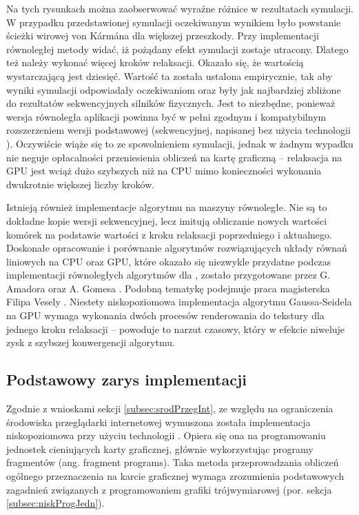 Na tych rysunkach można zaobserwować wyraźne różnice w rezultatach symulacji. W
przypadku przedstawionej symulacji oczekiwanym wynikiem było powstanie ścieżki
wirowej von Kármána dla większej przeszkody. Przy implementacji równoległej metody
 widać, iż pożądany efekt symulacji zostaje utracony. Dlatego
też należy wykonać więcej kroków relaksacji. Okazało się, że wartością
wystarczającą jest dziesięć. Wartość ta została ustalona empirycznie, tak aby
wyniki symulacji odpowiadały oczekiwaniom oraz były jak najbardziej zbliżone
do rezultatów sekwencyjnych silników fizycznych. Jest to niezbędne, ponieważ
wersja równoległa aplikacji \en powinna być w pełni zgodnym i kompatybilnym
rozszerzeniem wersji podstawowej (sekwencyjnej, napisanej bez użycia
technologii ). Oczywiście wiąże się to ze spowolnieniem symulacji,
jednak w żadnym wypadku nie neguje opłacalności przeniesienia obliczeń na
kartę graficzną -- relaksacja na GPU jest wciąż dużo szybszych niż na CPU mimo
konieczności wykonania dwukrotnie większej liczby kroków.

Istnieją również implementacje algorytmu  na maszyny
równoległe. Nie są to dokładne kopie wersji sekwencyjnej, lecz imitują
obliczanie nowych wartości komórek na podstawie wartości z kroku relaksacji
poprzedniego i aktualnego. Doskonałe opracowanie i porównanie algorytmów
rozwiązujących układy równań liniowych na CPU oraz GPU, które okazało się
niezwykle przydatne podczas implementacji równoległych algorytmów dla \en,
zostało przygotowane przez G. Amadora oraz A. Gomesa \cite{LinSolvers}.
Podobną tematykę podejmuje praca magisterska Filipa Vesely
\cite{masterSolvers}. Niestety niskopoziomowa implementacja algorytmu \ow
{Gaussa-Seidela} na GPU wymaga wykonania dwóch procesów renderowania do
tekstury dla jednego kroku relaksacji -- powoduje to narzut czasowy, który w
efekcie niweluje zysk z szybszej konwergencji algorytmu.

\subsection{Podstawowy zarys implementacji}

Zgodnie z wnioskami sekcji \ref{subsec:srodPrzegInt}, ze względu na ograniczenia
środowiska przeglądarki internetowej wymuszona została implementacja
niskopoziomowa przy użyciu technologii . Opiera się ona na
programowaniu jednostek cieniujących karty graficznej, głównie wykorzystując
programy fragmentów (ang. fragment programs). Taka metoda przeprowadzania
obliczeń ogólnego przeznaczenia na karcie graficznej wymaga zrozumienia
podstawowych zagadnień związanych z programowaniem grafiki trójwymiarowej (por.
sekcja \ref{subsec:niskProgJedn}).

